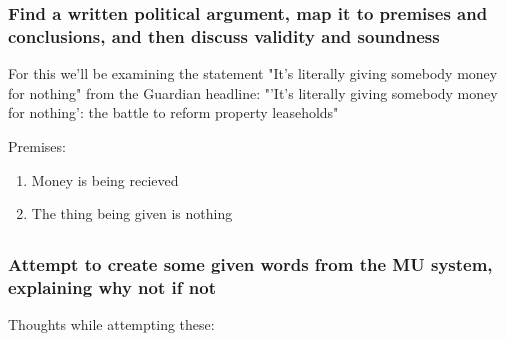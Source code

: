 \documentclass{article}
\begin{document}
\subsubsection{Find a written political argument, map it to
premises and conclusions, and then discuss validity and soundness}

For this we'll be examining the statement
"It's literally giving somebody money for nothing"
from the Guardian headline:
"'It's literally giving somebody money for nothing':
the battle to reform property leaseholds" \cite{guardianarticle}

Premises:
\begin{enumerate}
	\item Money is being recieved
	\item The thing being given is nothing
\end{enumerate}

 

\subsection{}

\subsubsection{Attempt to create some given words from the MU
system, explaining why not if not}
Thoughts while attempting these:
\end{document}
